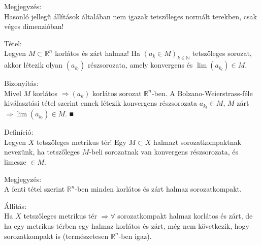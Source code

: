 \documentclass[12pt,a4paper]{scrartcl}
\newenvironment{definicio}{}{}
\newenvironment{tetel}{}{}
\newenvironment{bizonyitas}{}{}
\newenvironment{allitas}{}{}
\newenvironment{megjegyzes}{}{}
\begin{document}
\begin{bizonyitas}
\end{bizonyitas}

\begin{megjegyzes}

Megjegyzés:\\
Hasonló jellegű állítások általában nem igazak tetszőleges normált
terekben, csak véges dimenzióban!

\end{megjegyzes}

\begin{tetel}

Tétel:\\
Legyen \(M \subset {\mathbb{R}}^{n}\) korlátos és zárt halmaz! Ha
\(\left( {a_{k} \in M} \right)_{k \in {\mathbb{N}}}\) tetszőleges
sorozat, akkor létezik olyan \(\left( a_{k_{l}} \right)\) részsorozata,
amely konvergens és \(\lim\left( a_{k_{l}} \right) \in M\).

\end{tetel}

\begin{bizonyitas}

Bizonyítás:\\
Mivel \(M\) korlátos \(\left. \Rightarrow\left( a_{k} \right) \right.\)
korlátos sorozat \({\mathbb{R}}^{n}\)-ben. A Bolzano-Weierstrass-féle
kiválasztási tétel szerint ennek létezik konvergens részsorozata
\(a_{k_{l}} \in M\), \(M\) zárt
\(\left. \Rightarrow\lim\left( a_{k_{l}} \right) \in M \right.\). ■

\end{bizonyitas}

\begin{definicio}

Definíció:\\
Legyen \(X\) tetszőleges metrikus tér! Egy \(M \subset X\) halmazt
sorozatkompaktnak nevezünk, ha tetszőleges \(M\)-beli sorozatnak van
konvergens részsorozata, és limesze \(\in M\).

\end{definicio}

\begin{megjegyzes}

Megjegyzés:\\
A fenti tétel szerint \({\mathbb{R}}^{n}\)-ben minden korlátos és zárt
halmaz sorozatkompakt.

\end{megjegyzes}

\begin{allitas}

Állítás:\\
Ha \(X\) tetszőleges metrikus tér \(\left. \Rightarrow\forall \right.\)
sorozatkompakt halmaz korlátos és zárt, de ha egy metrikus térben egy
halmaz korlátos és zárt, még nem következik, hogy sorozatkompakt is
(természetesen \({\mathbb{R}}^{n}\)-ben igaz).

\end{allitas}
\end{document}
